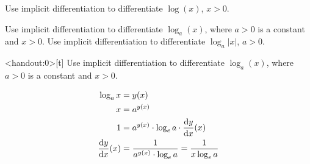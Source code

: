 \begin{frame}[t]
Use implicit differentiation to differentiate $\log(x)$, $x>0$.\color{answercolor}
\vfill

\end{frame}
\begin{frame}[t]
Use implicit differentiation to differentiate $\log_a(x)$, where $a>0$ is a constant and $x>0$.
\vfill
Use implicit differentiation to differentiate $\log_a|x|$, $a>0$.
\vfill
\AnswerYes\MoreSpace
\end{frame}
\begin{frame}<handout:0>[t]
Use implicit differentiation to differentiate $\log_a(x)$, where $a>0$ is a constant and $x>0$.\pause
\color{answercolor}\vfill

\begin{align*}
\log_a x &= y(x)\\
x&=a^{y(x)}\\
1&=a^{y(x)} \cdot \log_e a \cdot \frac{\text{d}y}{\text{d}x}(x)\\
\frac{\text{d}y}{\text{d}x}(x)&=\frac{1}{a^{y(x)} \cdot \log_e a} = \frac{1}{x\log_e a}
\end{align*}


\end{frame}
